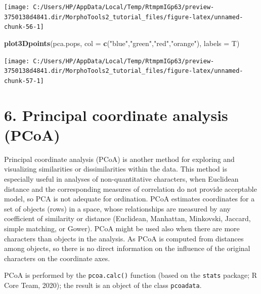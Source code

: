 \documentclass[
]{article}
\newenvironment{Shaded}{\begin{snugshade}}{\end{snugshade}}
\newcommand{\DataTypeTok}[1]{\textcolor[rgb]{0.13,0.29,0.53}{#1}}
\newcommand{\KeywordTok}[1]{\textcolor[rgb]{0.13,0.29,0.53}{\textbf{#1}}}
\newcommand{\NormalTok}[1]{#1}
\newcommand{\StringTok}[1]{\textcolor[rgb]{0.31,0.60,0.02}{#1}}
\begin{document}
\begin{center}\texttt{[image: C:/Users/HP/AppData/Local/Temp/RtmpmIGp63/preview-3750138d4841.dir/MorphoTools2\_tutorial\_files/figure-latex/unnamed-chunk-56-1]} \end{center}

\begin{Shaded}
\begin{Highlighting}[]
\KeywordTok{plot3Dpoints}\NormalTok{(pca.pops, }\DataTypeTok{col =} \KeywordTok{c}\NormalTok{(}\StringTok{"blue"}\NormalTok{,}\StringTok{"green"}\NormalTok{,}\StringTok{"red"}\NormalTok{,}\StringTok{"orange"}\NormalTok{), }\DataTypeTok{labels =}\NormalTok{ T)}
\end{Highlighting}
\end{Shaded}

\begin{center}\texttt{[image: C:/Users/HP/AppData/Local/Temp/RtmpmIGp63/preview-3750138d4841.dir/MorphoTools2\_tutorial\_files/figure-latex/unnamed-chunk-57-1]} \end{center}

\newpage

\hypertarget{principal-coordinate-analysis-pcoa}{%
\section{6. Principal coordinate analysis
(PCoA)}\label{principal-coordinate-analysis-pcoa}}

Principal coordinate analysis (PCoA) is another method for exploring and
visualizing similarities or dissimilarities within the data. This method
is especially useful in analyses of non-quantitative characters, when
Euclidean distance and the corresponding measures of correlation do not
provide acceptable model, so PCA is not adequate for ordination. PCoA
estimates coordinates for a set of objects (rows) in a space, whose
relationships are measured by any coefficient of similarity or distance
(Euclidean, Manhattan, Minkovski, Jaccard, simple matching, or Gower).
PCoA might be used also when there are more characters than objects in
the analysis. As PCoA is computed from distances among objects, so there
is no direct information on the influence of the original characters on
the coordinate axes.

PCoA is performed by the \texttt{pcoa.calc()} function (based on the
\texttt{stats} package; R Core Team, 2020); the result is an object of
the class \texttt{pcoadata}.
\end{document}
